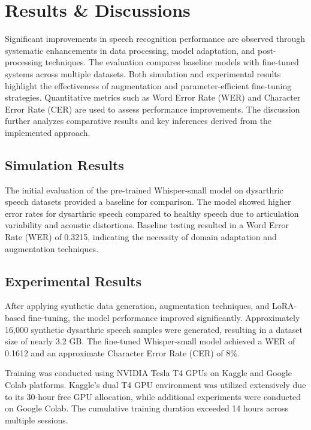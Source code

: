 \chapter{Results \& Discussions}

Significant improvements in speech recognition performance are observed through systematic enhancements in data processing, model adaptation, and post-processing techniques. The evaluation compares baseline models with fine-tuned systems across multiple datasets. Both simulation and experimental results highlight the effectiveness of augmentation and parameter-efficient fine-tuning strategies. Quantitative metrics such as Word Error Rate (WER) and Character Error Rate (CER) are used to assess performance improvements. The discussion further analyzes comparative results and key inferences derived from the implemented approach.

\section{Simulation Results}

The initial evaluation of the pre-trained Whisper-small model on dysarthric speech datasets provided a baseline for comparison. The model showed higher error rates for dysarthric speech compared to healthy speech due to articulation variability and acoustic distortions. Baseline testing resulted in a Word Error Rate (WER) of 0.3215, indicating the necessity of domain adaptation and augmentation techniques.

\section{Experimental Results}

After applying synthetic data generation, augmentation techniques, and LoRA-based fine-tuning, the model performance improved significantly. Approximately 16,000 synthetic dysarthric speech samples were generated, resulting in a dataset size of nearly 3.2 GB. The fine-tuned Whisper-small model achieved a WER of 0.1612 and an approximate Character Error Rate (CER) of 8\%.

Training was conducted using NVIDIA Tesla T4 GPUs on Kaggle and Google Colab platforms. Kaggle’s dual T4 GPU environment was utilized extensively due to its 30-hour free GPU allocation, while additional experiments were conducted on Google Colab. The cumulative training duration exceeded 14 hours across multiple sessions.

